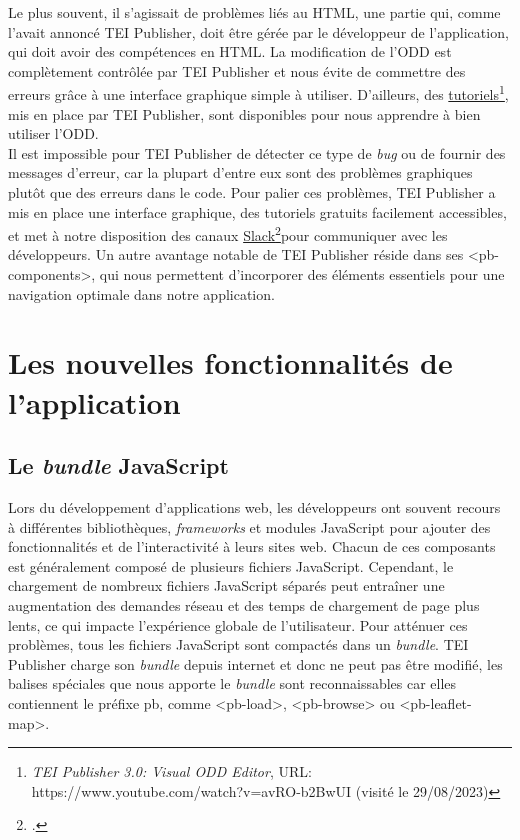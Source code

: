 Le plus souvent, il s'agissait de problèmes liés au HTML, une partie qui, comme l'avait annoncé TEI Publisher, doit être gérée par le développeur de l'application, qui doit avoir des compétences en HTML. La modification de l'ODD est complètement contrôlée par TEI Publisher et nous évite de commettre des erreurs grâce à une interface graphique simple à utiliser. D'ailleurs, des \href{https://www.youtube.com/watch?v=avRO-b2BwUI&ab_channel=wolfgangmm}{tutoriels}\footnote{\textit{TEI Publisher 3.0: Visual ODD Editor}, URL: https://www.youtube.com/watch?v=avRO-b2BwUI (visité le 29/08/2023)}, mis en place par TEI Publisher, sont disponibles pour nous apprendre à bien utiliser l'ODD.\\

Il est impossible pour TEI Publisher de détecter ce type de \textit{bug} ou de fournir des messages d'erreur, car la plupart d'entre eux sont des problèmes graphiques plutôt que des erreurs dans le code. 
Pour palier ces problèmes, TEI Publisher a mis en place une interface graphique, des tutoriels gratuits facilement accessibles, et met à notre disposition des canaux \href{https://app.slack.com/client/T012TH5TPJA/browse-channels/thread/C012YTJP5HB-1654605524.721479}{Slack\footcite{AllChannelsEeditiones}}pour communiquer avec les développeurs. Un autre avantage notable de TEI Publisher réside dans ses <pb-components>, qui nous permettent d'incorporer des éléments essentiels pour une navigation optimale dans notre application.

\chapter{Les nouvelles fonctionnalités de l'application}

\section{Le \textit{bundle} JavaScript}

Lors du développement d'applications web, les développeurs ont souvent recours à différentes bibliothèques, \textit{frameworks} et modules JavaScript pour ajouter des fonctionnalités et de l'interactivité à leurs sites web. Chacun de ces composants est généralement composé de plusieurs fichiers JavaScript. Cependant, le chargement de nombreux fichiers JavaScript séparés peut entraîner une augmentation des demandes réseau et des temps de chargement de page plus lents, ce qui impacte l'expérience globale de l'utilisateur. Pour atténuer ces problèmes, tous les fichiers JavaScript sont compactés dans un \textit{bundle}. TEI Publisher charge son \textit{bundle} depuis internet et donc ne peut pas être modifié, les balises spéciales que nous apporte le \textit{bundle} sont reconnaissables car elles contiennent le préfixe \og{}pb\fg{}, comme <pb-load>, <pb-browse> ou <pb-leaflet-map>.


